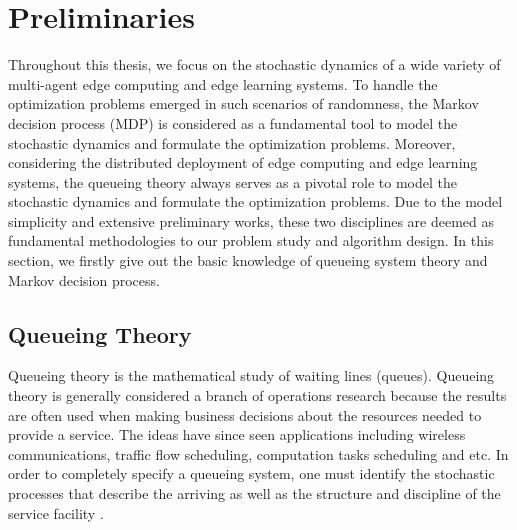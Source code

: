 
\section{Preliminaries}
Throughout this thesis, we focus on the stochastic dynamics of a wide variety of multi-agent edge computing and edge learning systems.
To handle the optimization problems emerged in such scenarios of randomness,
the Markov decision process (MDP) is considered as a fundamental tool to model the stochastic dynamics and formulate the optimization problems.
Moreover, considering the distributed deployment of edge computing and edge learning systems, the queueing theory always serves as a pivotal role to model the stochastic dynamics and formulate the optimization problems.
Due to the model simplicity and extensive preliminary works, these two disciplines are deemed as fundamental methodologies to our problem study and algorithm design.
In this section, we firstly give out the basic knowledge of queueing system theory and Markov decision process.

\subsection{Queueing Theory}
Queueing theory is the mathematical study of waiting lines (queues).
Queueing theory is generally considered a branch of operations research because the results are often used when making business decisions about the resources needed to provide a service.
The ideas have since seen applications including wireless communications, traffic flow scheduling, computation tasks scheduling and etc.
In order to completely specify a queueing system, one must identify the stochastic processes that describe the arriving as well as the structure and discipline of the service facility \cite{thomas1976queueing}.

